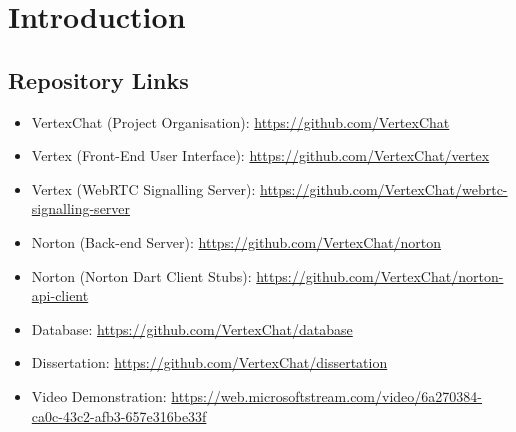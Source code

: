 \chapter{Introduction}
\section{Repository Links}
\begin{itemize}
    \item VertexChat (Project Organisation): \url{https://github.com/VertexChat}
	\item Vertex (Front-End User Interface): \url{https://github.com/VertexChat/vertex}
	\item Vertex (WebRTC Signalling Server): \url{https://github.com/VertexChat/webrtc-signalling-server}
	\item Norton (Back-end Server): \url{https://github.com/VertexChat/norton}
	\item Norton (Norton Dart Client Stubs): \url{https://github.com/VertexChat/norton-api-client}
	\item Database: \url{https://github.com/VertexChat/database}
	\item Dissertation: \url{https://github.com/VertexChat/dissertation}
	\item Video Demonstration: \url{https://web.microsoftstream.com/video/6a270384-ca0c-43c2-afb3-657e316be33f}
\end{itemize}
